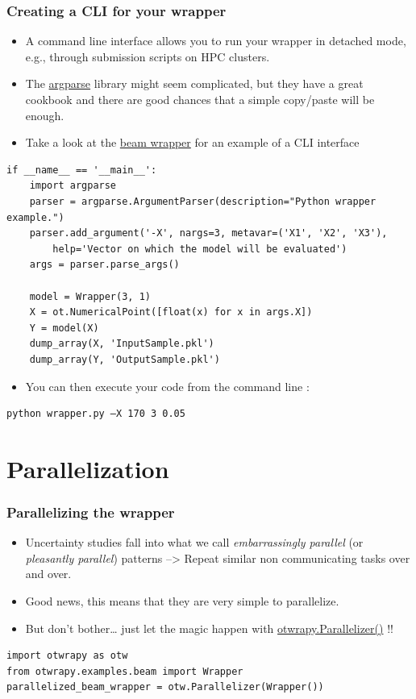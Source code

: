 \documentclass[10pt, aspectratio=169]{beamer}
\begin{document}
\begin{frame}[fragile]
\frametitle{Creating a CLI for your wrapper}
\begin{itemize}
\item A command line interface allows you to run your wrapper in detached
  mode, e.g., through submission scripts on HPC clusters.
\item The \href{https://docs.python.org/3/library/argparse.html}{argparse} library might seem complicated, but they have a great
  cookbook and there are good chances that a simple copy/paste will be
  enough.
\item Take a look at the \href{https://github.com/openturns/otwrapy/tree/master/otwrapy/examples/beam}{beam wrapper}  for an example of a CLI interface
\end{itemize}
\begin{Verbatim}[xleftmargin=10mm]
if __name__ == '__main__':
    import argparse
    parser = argparse.ArgumentParser(description="Python wrapper example.")
    parser.add_argument('-X', nargs=3, metavar=('X1', 'X2', 'X3'),
        help='Vector on which the model will be evaluated')
    args = parser.parse_args()

    model = Wrapper(3, 1)
    X = ot.NumericalPoint([float(x) for x in args.X])
    Y = model(X)
    dump_array(X, 'InputSample.pkl')
    dump_array(Y, 'OutputSample.pkl')
\end{Verbatim}
\begin{itemize}
\item You can then execute your code from the command line :
\end{itemize}
\begin{Verbatim}[xleftmargin=10mm]
python wrapper.py –X 170 3 0.05
\end{Verbatim}
\end{frame}

\section{Parallelization}
\label{sec-7}
\begin{frame}[fragile]
\frametitle{Parallelizing the wrapper}
\begin{itemize}
\item Uncertainty studies fall into what we call \textit{embarrassingly parallel} (or \textit{pleasantly parallel}) patterns --> Repeat similar non communicating tasks over and over.
\item Good news, this means that they are very simple to parallelize.
\item But don't bother\ldots{} just let the magic happen with \href{http://openturns.github.io/otwrapy/master/_generated/otwrapy.Parallelizer.html}{otwrapy.Parallelizer()} !!
\end{itemize}
\begin{Verbatim}[xleftmargin=10mm]
import otwrapy as otw
from otwrapy.examples.beam import Wrapper
parallelized_beam_wrapper = otw.Parallelizer(Wrapper())
\end{Verbatim}
\end{frame}
\end{document}
